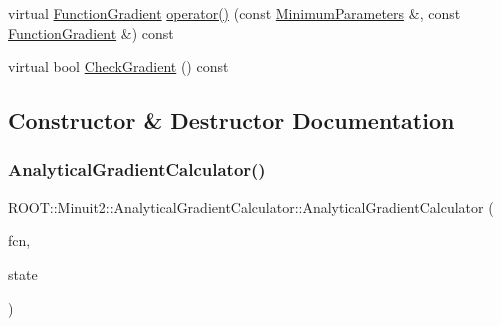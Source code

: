 \begin{DoxyCompactItemize}
\item 
virtual \mbox{\hyperlink{classROOT_1_1Minuit2_1_1FunctionGradient}{Function\+Gradient}} \mbox{\hyperlink{classROOT_1_1Minuit2_1_1AnalyticalGradientCalculator_a4048ce1c6e9b120f5cb808f090a90030}{operator()}} (const \mbox{\hyperlink{classROOT_1_1Minuit2_1_1MinimumParameters}{Minimum\+Parameters}} \&, const \mbox{\hyperlink{classROOT_1_1Minuit2_1_1FunctionGradient}{Function\+Gradient}} \&) const
\item 
virtual bool \mbox{\hyperlink{classROOT_1_1Minuit2_1_1AnalyticalGradientCalculator_aad6bcafd96845df588392bb7b255ece8}{Check\+Gradient}} () const
\end{DoxyCompactItemize}


\subsection{Constructor \& Destructor Documentation}
\mbox{\label{classROOT_1_1Minuit2_1_1AnalyticalGradientCalculator_a7cd3bd0ee00315f4e67cf4ad2a96790e}} 
\subsubsection{\texorpdfstring{AnalyticalGradientCalculator()}{AnalyticalGradientCalculator()}\hspace{0.1cm}{\footnotesize\ttfamily [1/2]}}
{\footnotesize\ttfamily R\+O\+O\+T\+::\+Minuit2\+::\+Analytical\+Gradient\+Calculator\+::\+Analytical\+Gradient\+Calculator (\begin{DoxyParamCaption}\item[{const \mbox{\hyperlink{classROOT_1_1Minuit2_1_1FCNGradientBase}{F\+C\+N\+Gradient\+Base}} \&}]{fcn,  }\item[{const \mbox{\hyperlink{classROOT_1_1Minuit2_1_1MnUserTransformation}{Mn\+User\+Transformation}} \&}]{state }\end{DoxyParamCaption})\hspace{0.3cm}{\ttfamily [inline]}}

\mbox{\label{classROOT_1_1Minuit2_1_1AnalyticalGradientCalculator_a18d82365bea770691dae6f3b44d19ed4}} 
